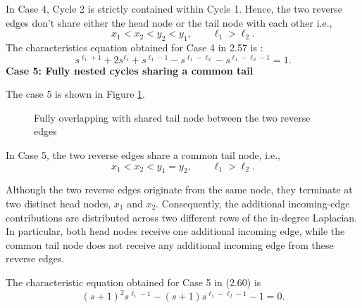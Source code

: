 \documentclass[11pt,a4paper]{article}
\begin{document}
In Case 4, Cycle 2 is strictly contained within Cycle 1. Hence, the two reverse edges don't share either the head node or the tail node with each other i.e.,
\begin{equation}
    x_1 < x_2 < y_2 < y_1,
    \qquad \ell_1 > \ell_2.
\end{equation}
The  characteristics equation obtained for Case 4 in 2.57 is :
\begin{equation}\label{eq:case4_theorem_statement}
	s^{\ell_1+1} + 2s^{\ell_1} + s^{\ell_1-1} - s^{\ell_1-\ell_2} - s^{\ell_1-\ell_2-1} = 1.
\tag{2.57}
\end{equation}
\textbf{Case 5: Fully nested cycles sharing a common tail}

The case 5 is shown in Figure \ref{Case5}.
\begin{figure}[H]
		\centering
		\caption{Fully overlapping with shared tail node between the two reverse edges}
		\label{Case5}
	\end{figure}


In Case 5, the two reverse edges share a common tail node, i.e.,
\begin{equation}
    x_1 < x_2 < y_1 = y_2,
    \qquad \ell_1 > \ell_2.
\end{equation}

Although the two reverse edges originate from the same node, they terminate at two distinct head nodes, $x_1$ and $x_2$. Consequently, the additional incoming-edge contributions are distributed across two different rows of the in-degree Laplacian. In particular, both head nodes receive one additional incoming edge, while the common tail node does not receive any additional incoming edge from these reverse edges.

The characteristic equation obtained for Case 5 in (2.60) is
\begin{equation}
    (s+1)^2s^{\ell_1-1}
    -(s+1)s^{\ell_1-\ell_2-1}-1=0.
    \tag{2.60}
\end{equation}
\end{document}
